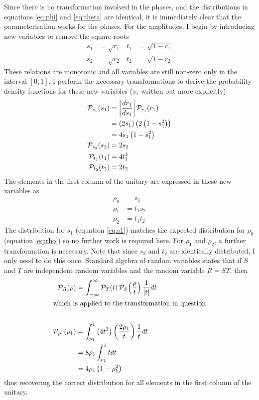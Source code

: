 \documentclass[a4paper,11pt]{article}
\begin{document}
Since there is no transformation involved in the phases, and the distributions
in equations \ref{eq:phi} and \ref{eq:theta} are identical, it is immediately
clear that the parameterisation works for the phases. For the amplitudes, I
begin by introducing new variables to remove the square roots
\begin{align}
  s_{1} &= \sqrt{r_{1}} & t_{1} &= \sqrt{1-r_{1}} \\
  s_{2} &= \sqrt{r_{2}} & t_{2} &= \sqrt{1-r_{2}}
\end{align}
These relations are monotonic and all variables are still non-zero only in the
interval \(\left[ 0,1 \right]\). I perform the necessary transformations to
derive the probability density functions for these new variables (\(s_{1}\)
written out more explicitly):
\begin{align}
  \mathcal{P}_{s_{1}} \!\left(s_{1}\right) &= \left| \frac{dr_{1}}{ds_{1}} \right|
    \mathcal{P}_{r_{1}} \!\left(r_{1}\right) \\
  &= \left( 2s_{1} \right) \left( 2 \left( 1-s_{1}^{2} \right) \right) \\
  \label{eq:s1}
  &= 4 s_{1} \left( 1-s_{1}^{2} \right) \\
  \label{eq:s2}
  \mathcal{P}_{s_{2}} \!\left(s_{2}\right) &= 2 s_{2} \\
  \label{eq:t1}
  \mathcal{P}_{t_{1}} \!\left(t_{1}\right) &= 4 t_{1}^{3} \\
  \label{eq:t2}
  \mathcal{P}_{t_{2}} \!\left(t_{2}\right) &= 2 t_{2} \\
\end{align}
The elements in the first column of the unitary are expressed in these new
variables as
\begin{align}
  \rho_{0} &= s_{1} \\
  \rho_{1} &= t_{1} s_{2} \\
  \rho_{2} &= t_{1} t_{2}
\end{align}
The distribution for \(s_{1}\) (equation \ref{eq:s1}) matches the expected
distribution for \(\rho_{0}\) (equation \ref{eq:rho}) so no further work is
required here. For \(\rho_{1}\) and \(\rho_{2}\), a further transformation is
necessary. Note that since \(s_{2}\) and \(t_{2}\) are identically distributed,
I only need to do this once. Standard algebra of random variables states that if
\(S\) and \(T\) are independent random variables and the random variable \(R =
ST\), then
\begin{align}
  \mathcal{P}_{R} \!\left(\rho\right) &= \int_{-\infty}^{\infty} \mathcal{P}_{T} \!\left(t\right)
    \mathcal{P}_{S} \!\left(\frac{\rho}{t}\right) \frac{1}{\left|t\right|} dt \\
  \intertext{which is applied to the transformation in question} \\
  \mathcal{P}_{\rho_{1}} \!\left(\rho_{1}\right) &= \int_{\rho_{1}}^{1} \left( 4 t^{3} \right)
    \left( \frac{2 \rho_{1}}{t} \right) \frac{1}{t} dt \\
  &= 8 \rho_{1} \int_{\rho_{1}}^{1} t dt \\
  &= 4 \rho_{1} \left( 1-\rho_{1}^{2} \right)
\end{align}
thus recovering the correct distribution for all elements in the first column of
the unitary.
\end{document}
